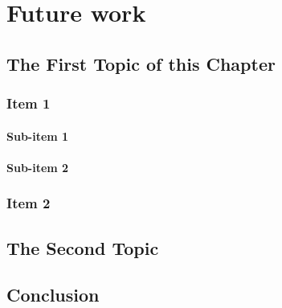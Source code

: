 \chapter{Future work} %
\label{cha:n}
\lipsum[79]

\section{The First Topic of this Chapter}
\subsection{Item 1}
\subsubsection{Sub-item 1}
\lipsum[80]

\subsubsection{Sub-item 2}
\lipsum[81]

\subsection{Item 2}
\lipsum[82]

\section{The Second Topic}
\lipsum[83-85]

\section{Conclusion} %
\lipsum[86-88]

